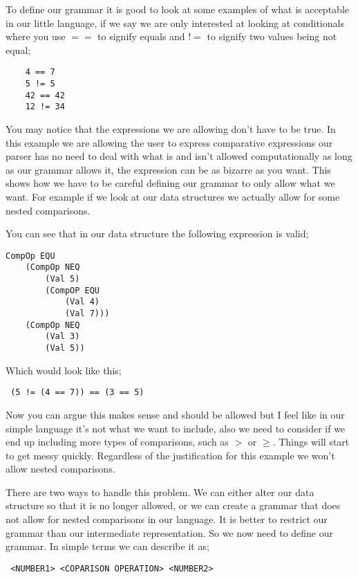 To define our grammar it is good to look at some examples of what is acceptable in our little language, if we say we are only interested at looking at conditionals where you use $==$ to signify equals and $!=$ to signify two values being not equal;

\begin{lstlisting}
	4 == 7
	5 != 5
	42 == 42
	12 != 34 
\end{lstlisting}

You may notice that the expressions we are allowing don't have to be true. In this example we are allowing the user to express comparative expressions our parser has no need to deal with what is and isn't allowed computationally as long as our grammar allows it, the expression can be as bizarre as you want. This shows how we have to be careful defining our grammar to only allow what we want. For example if we look at our data structures we actually allow for some nested comparisons.

\newpage

You can see that in our data structure the following expression is valid;

\begin{lstlisting}
CompOp EQU 
	(CompOp NEQ 
		(Val 5) 
		(CompOP EQU 
			(Val 4)
			(Val 7))) 
	(CompOp NEQ 
		(Val 3) 
		(Val 5))
\end{lstlisting}

Which would look like this;

\begin{lstlisting}
 (5 != (4 == 7)) == (3 == 5)
\end{lstlisting}

Now you can argue this makes sense and should be allowed but I feel like in our simple language it's not what we want to include, also we need to consider if we end up including more types of comparisons, such as $>$ or $\geq$. Things will start to get messy quickly. Regardless of the justification for this example we won't allow nested comparisons. 

There are two ways to handle this problem. We can either alter our data structure so that it is no longer allowed, or we can create a grammar that does not allow for nested comparisons in our language. It is better to restrict our grammar than our intermediate representation. So we now need to define our grammar. In simple terms we can describe it as;

\begin{lstlisting}
 <NUMBER1> <COPARISON OPERATION> <NUMBER2>
\end{lstlisting}   	

